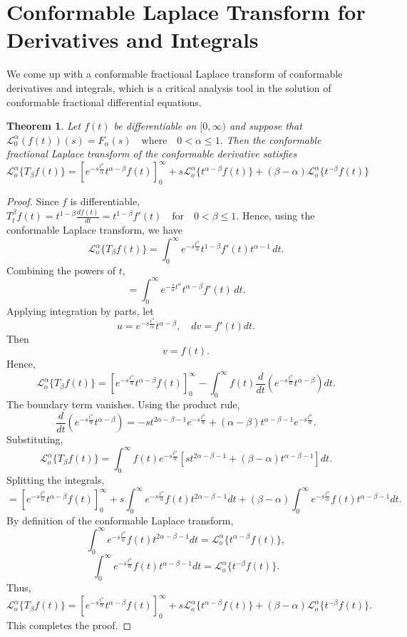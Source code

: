 \documentclass[two side,reqno,12pt]{amsart}
\numberwithin{equation}{section}
\newtheorem{theorem}[lemma]{Theorem}
\theoremstyle{definition}
\begin{document}
\section{Conformable Laplace Transform for Derivatives and Integrals}
We come up with a conformable fractional Laplace transform of conformable derivatives and integrals, which is a critical analysis tool in the solution of conformable fractional differential equations.
\begin{theorem} \label{thm:2.1}
 Let \( f(t) \) be differentiable on \( [0, \infty) \) and suppose that
$
\mathcal{L}_0^\alpha(f(t))(s) = F_{\alpha}(s) \quad \text{where}\quad 0 < \alpha \leq 1.
$
Then the conformable fractional Laplace transform of the conformable derivative satisfies
\[
\mathcal{L}_{o}^{\alpha}\{T_{\beta}f(t)\}
= \left[e^{-s\frac{t^{\alpha}}{\alpha}}t^{\alpha-\beta}f(t)\right]_{0}^{\infty}+
s\mathcal{L}_{o}^{\alpha}\{t^{\alpha-\beta}f(t)\}
+
(\beta-\alpha)\mathcal{L}_{o}^{\alpha}\{t^{-\beta}f(t)\}
\]  
\end{theorem}
\begin{proof}
Since $f$ is differentiable,
$\displaystyle 
T_t^\beta f(t) = t^{1-\beta} \frac{df(t)}{dt}=t^{1-\beta}f'(t) \quad \text{for} \quad 0<\beta\leq 1.
$
Hence, using the conformable Laplace transform, we have
\[
\mathcal{L}_{o}^{\alpha}\{T_{\beta}f(t)\}
=
\int_{0}^{\infty}
e^{-s\frac{t^{\alpha}}{\alpha}}
t^{1-\beta}f'(t)t^{\alpha-1}\,dt.
\]
Combining the powers of $t$,
\[
=
\int_{0}^{\infty}
e^{-\frac{s}{\alpha}t^{\alpha}}
t^{\alpha-\beta}f'(t)\,dt.
\]
Applying integration by parts, let
\[
u=e^{-s\frac{t^{\alpha}}{\alpha}}t^{\alpha-\beta}, 
\quad dv=f'(t)dt.
\]
Then
\[
v=f(t).
\]
Hence,
\[
\mathcal{L}_{o}^{\alpha}\{T_{\beta}f(t)\}
=
\left[e^{-s\frac{t^{\alpha}}{\alpha}}t^{\alpha-\beta}f(t)\right]_{0}^{\infty}
-
\int_{0}^{\infty}
f(t)\frac{d}{dt}
\left(e^{-s\frac{t^{\alpha}}{\alpha}}t^{\alpha-\beta}\right)dt.
\]
The boundary term vanishes. Using the product rule,
\[
\frac{d}{dt}
\left(e^{-s\frac{t^{\alpha}}{\alpha}}t^{\alpha-\beta}\right)
=
-s t^{2\alpha-\beta-1}e^{-s\frac{t^{\alpha}}{\alpha}}
+
(\alpha-\beta)t^{\alpha-\beta-1}e^{-s\frac{t^{\alpha}}{\alpha}}.
\]
Substituting,
\[
\mathcal{L}_{o}^{\alpha}\{T_{\beta}f(t)\}
=
\int_{0}^{\infty}
f(t)e^{-s\frac{t^{\alpha}}{\alpha}}
\left[
s t^{2\alpha-\beta-1}+(\beta-\alpha)t^{\alpha-\beta-1}
\right]dt.
\]
Splitting the integrals,
\[
= \left[e^{-s\frac{t^{\alpha}}{\alpha}}t^{\alpha-\beta}f(t)\right]_{0}^{\infty}+
s\int_{0}^{\infty}
e^{-s\frac{t^{\alpha}}{\alpha}}f(t)t^{2\alpha-\beta-1}dt
+
(\beta-\alpha)
\int_{0}^{\infty}
e^{-s\frac{t^{\alpha}}{\alpha}}f(t)t^{\alpha-\beta-1}dt.
\]
By definition of the conformable Laplace transform,
\[
\int_{0}^{\infty}
e^{-s\frac{t^{\alpha}}{\alpha}}f(t)t^{2\alpha-\beta-1}dt
=
\mathcal{L}_{o}^{\alpha}\{t^{\alpha-\beta}f(t)\},
\]
\[
\int_{0}^{\infty}
e^{-s\frac{t^{\alpha}}{\alpha}}f(t)t^{\alpha-\beta-1}dt
=
\mathcal{L}_{o}^{\alpha}\{t^{-\beta}f(t)\}.
\]
Thus,
\[
\mathcal{L}_{o}^{\alpha}\{T_{\beta}f(t)\}
= \left[e^{-s\frac{t^{\alpha}}{\alpha}}t^{\alpha-\beta}f(t)\right]_{0}^{\infty}+
s\mathcal{L}_{o}^{\alpha}\{t^{\alpha-\beta}f(t)\}
+
(\beta-\alpha)\mathcal{L}_{o}^{\alpha}\{t^{-\beta}f(t)\}.
\]
This completes the proof.
\end{proof}
\end{document}
